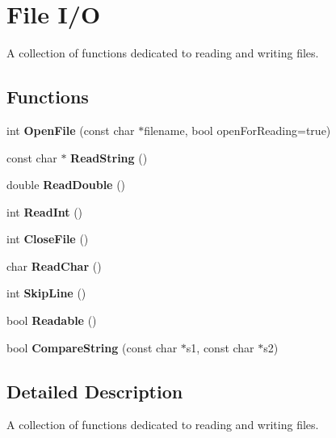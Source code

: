 \hypertarget{group__File__group}{}\section{File I/O}
\label{group__File__group}


A collection of functions dedicated to reading and writing files.  


\subsection*{Functions}
\begin{DoxyCompactItemize}
\item 
\mbox{\label{group__File__group_ga553c2144e2f0a4c61d7aed8c5d561501}} 
int {\bfseries Open\+File} (const char $\ast$filename, bool open\+For\+Reading=true)
\item 
\mbox{\label{group__File__group_ga43eae8b44c4184c715ab23b85565a004}} 
const char $\ast$ {\bfseries Read\+String} ()
\item 
\mbox{\label{group__File__group_gaa9eec68bfffa4487130d80b1a6155618}} 
double {\bfseries Read\+Double} ()
\item 
\mbox{\label{group__File__group_gacc9a6d7c7f6db257ec75b61d8e906bb6}} 
int {\bfseries Read\+Int} ()
\item 
\mbox{\label{group__File__group_ga272f09e93d6493d458e7b6345311c4ed}} 
int {\bfseries Close\+File} ()
\item 
\mbox{\label{group__File__group_ga0147861e13e87fbe862d945d1c42a0f3}} 
char {\bfseries Read\+Char} ()
\item 
\mbox{\label{group__File__group_ga35cc87959bf76ea31730a5850e6b5424}} 
int {\bfseries Skip\+Line} ()
\item 
\mbox{\label{group__File__group_gae8eed210d6fcc7f789a9798a7381b739}} 
bool {\bfseries Readable} ()
\item 
\mbox{\label{group__File__group_ga0df5f0f378d61bec4702d8230481e437}} 
bool {\bfseries Compare\+String} (const char $\ast$s1, const char $\ast$s2)
\end{DoxyCompactItemize}


\subsection{Detailed Description}
A collection of functions dedicated to reading and writing files. 

